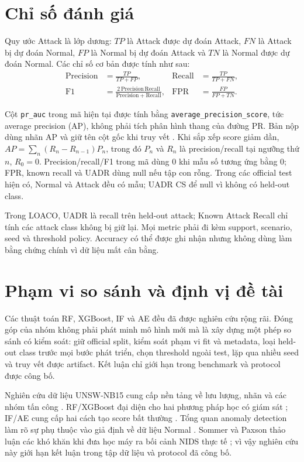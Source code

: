 \documentclass[12pt,a4paper,oneside]{report}
\begin{document}
\section{Chỉ số đánh giá}

Quy ước Attack là lớp dương: $TP$ là Attack được dự đoán Attack, $FN$ là Attack bị dự đoán Normal, $FP$ là Normal bị dự đoán Attack và $TN$ là Normal được dự đoán Normal. Các chỉ số cơ bản được tính như sau:
\begin{align}
\mathrm{Precision} &= \frac{TP}{TP+FP}, &
\mathrm{Recall} &= \frac{TP}{TP+FN},\\
\mathrm{F1} &= \frac{2\,\mathrm{Precision}\,\mathrm{Recall}}
{\mathrm{Precision}+\mathrm{Recall}}, &
\mathrm{FPR} &= \frac{FP}{FP+TN}.
\end{align}

Cột \texttt{pr\_auc} trong mã hiện tại được tính bằng \texttt{average\_precision\_score}, tức average precision (AP), không phải tích phân hình thang của đường PR. Bản nộp dùng nhãn AP và giữ tên cột gốc khi truy vết \cite{saito2015,davis2006}. Khi sắp xếp score giảm dần, $AP=\sum_n(R_n-R_{n-1})P_n$, trong đó $P_n$ và $R_n$ là precision/recall tại ngưỡng thứ $n$, $R_0=0$. Precision/recall/F1 trong mã dùng 0 khi mẫu số tương ứng bằng 0; FPR, known recall và UADR dùng null nếu tập con rỗng. Trong các official test hiện có, Normal và Attack đều có mẫu; UADR CS để null vì không có held-out class.

Trong LOACO, UADR là recall trên held-out attack; Known Attack Recall chỉ tính các attack class không bị giữ lại. Mọi metric phải đi kèm support, scenario, seed và threshold policy. Accuracy có thể được ghi nhận nhưng không dùng làm bằng chứng chính vì dữ liệu mất cân bằng.

\section{Phạm vi so sánh và định vị đề tài}

Các thuật toán RF, XGBoost, IF và AE đều đã được nghiên cứu rộng rãi. Đóng góp của nhóm không phải phát minh mô hình mới mà là xây dựng một phép so sánh có kiểm soát: giữ official split, kiểm soát phạm vi fit và metadata, loại held-out class trước mọi bước phát triển, chọn threshold ngoài test, lặp qua nhiều seed và truy vết được artifact. Kết luận chỉ giới hạn trong benchmark và protocol được công bố.


Nghiên cứu dữ liệu UNSW-NB15 cung cấp nền tảng về lưu lượng, nhãn và các nhóm tấn công \cite{moustafa2015,moustafa2016}. RF/XGBoost đại diện cho hai phương pháp học có giám sát \cite{breiman2001,chen2016}; IF/AE cung cấp hai cách tạo score bất thường \cite{liu2008,sakurada2014}. Tổng quan anomaly detection làm rõ sự phụ thuộc vào giả định về dữ liệu Normal \cite{chandola2009}. Sommer và Paxson thảo luận các khó khăn khi đưa học máy ra bối cảnh NIDS thực tế \cite{sommer2010}; vì vậy nghiên cứu này giới hạn kết luận trong tập dữ liệu và protocol đã công bố.
\end{document}
